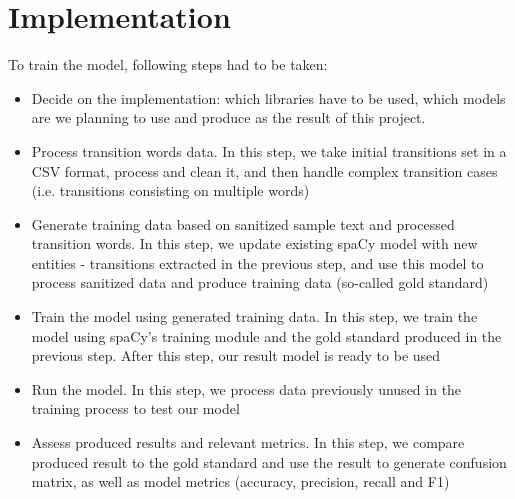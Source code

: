 \documentclass[conference]{IEEEtran}
\begin{document}
\section{Implementation}
To train the model, following steps had to be taken:
\begin{itemize}
    \item Decide on the implementation: which libraries have to be used, which models are we planning to use and produce as the result of this project.
    \item Process transition words data. In this step, we take initial transitions set in a CSV format, process and clean it, and then handle complex transition cases (i.e. transitions consisting on multiple words)
    \item Generate training data based on sanitized sample text and processed transition words. In this step, we update existing spaCy model with new entities - transitions extracted in the previous step, and use this model to process sanitized data and produce training data (so-called gold standard)
    \item Train the model using generated training data. In this step, we train the model using spaCy’s training module and the gold standard produced in the previous step. After this step, our result model is ready to be used
    \item Run the model. In this step, we process data previously unused in the training process to test our model
    \item Assess produced results and relevant metrics. In this step, we compare produced result to the gold standard and use the result to generate confusion matrix, as well as model metrics (accuracy, precision, recall and F1)
\end{itemize}
\end{document}
